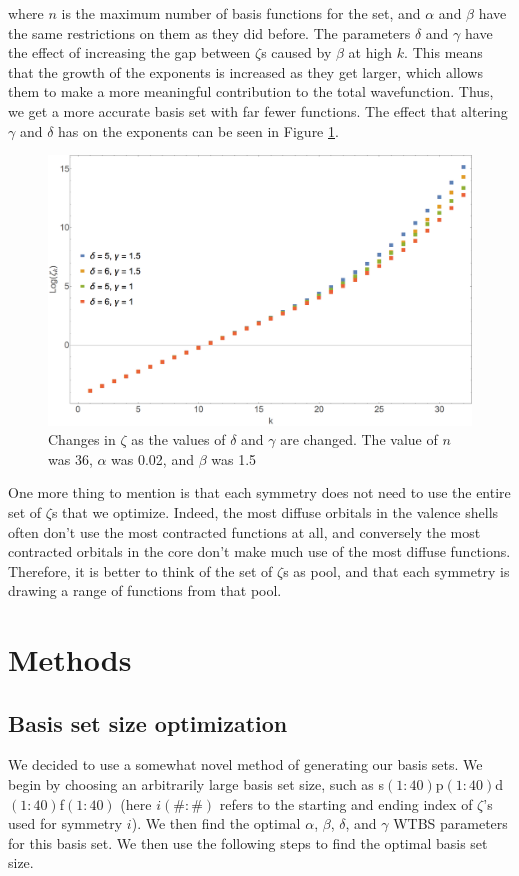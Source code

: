 where $n$ is the maximum number of basis functions for the set, and $\alpha$ and $\beta$ have the same restrictions on them as they did before. The parameters $\delta$ and $\gamma$ have the effect of increasing the gap between $\zeta$s caused by $\beta$ at high $k$. This means that the growth of the exponents is increased as they get larger, which allows them to make a more meaningful contribution to the total wavefunction. Thus, we get a more accurate basis set with far fewer functions. The effect that altering $\gamma$ and $\delta$ has on the exponents can be seen in Figure \ref{fig:deltagamm}.

\begin{figure}
\center
\includegraphics[width=1\textwidth]{Figures/deltagamm.png}
\caption[Changes in $\zeta$ as the values of $\delta$ and $\gamma$ are changed.]
{Changes in $\zeta$ as the values of $\delta$ and $\gamma$ are changed. The value of $n$ was 36, $\alpha$ was 0.02, and $\beta$ was 1.5}
\label{fig:deltagamm}
\end{figure}

One more thing to mention is that each symmetry does not need to use the entire set of $\zeta$s that we optimize. Indeed, the most diffuse orbitals in the valence shells often don't use the most contracted functions at all, and conversely the most contracted orbitals in the core don't make much use of the most diffuse functions. Therefore, it is better to think of the set of $\zeta$s as pool, and that each symmetry is drawing a range of functions from that pool.  

\section{Methods}
\subsection{Basis set size optimization}
We decided to use a somewhat novel method of generating our basis sets. We begin by choosing an arbitrarily large basis set size, such as s$(1:40)$p$(1:40)$d$(1:40)$f$(1:40)$ (here $i(\#:\#)$ refers to the starting and ending index of $\zeta$'s used for symmetry $i$). We then find the optimal $\alpha$, $\beta$, $\delta$, and $\gamma$ WTBS parameters for this basis set. We then use the following steps to find the optimal basis set size.

